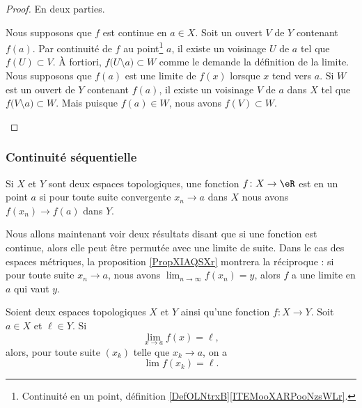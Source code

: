 \begin{proof}
	En deux parties.
	\begin{subproof}
		\spitem[\( \Rightarrow\)]
		Nous supposons que \( f\) est continue en \( a\in X\). Soit un ouvert \( V\) de \( Y\) contenant \( f(a)\). Par continuité de \( f\) au point\footnote{Continuité en un point, définition \ref{DefOLNtrxB}\ref{ITEMooXARPooNzsWLr}.} \( a\), il existe un voisinage \( U\) de \( a\) tel que \( f(U)\subset V\). À fortiori, \( f\big( U\setminus{{a}} \big)\subset W\) comme le demande la définition de la limite.
		\spitem[\( \Leftarrow\)]
		Nous supposons que \( f(a)\) est une limite de \( f(x)\) lorsque \( x\) tend vers \( a\). Si \( W\) est un ouvert de \( Y\) contenant \( f(a)\), il existe un voisinage \( V\) de \( a\) dans \( X\) tel que \( f\big( V\setminus{{a}} \big)\subset W\). Mais puisque \( f(a)\in W\), nous avons \( f(V)\subset W\).
	\end{subproof}
\end{proof}


\subsubsection{Continuité séquentielle}

\begin{definition}  \label{DefENioICV}
	Si \( X\) et \( Y \) sont deux espaces topologiques, une fonction \( f\colon X\to \eR\) est  en un point \( a\) si pour toute suite convergente \( x_n\to a\) dans \( X\) nous avons \( f(x_n)\to f(a)\) dans \( Y\).
\end{definition}

\begin{normaltext}
	Nous allons maintenant voir deux résultats disant que si une fonction est continue, alors elle peut être permutée avec une limite de suite. Dans le cas des espaces métriques, la proposition \ref{PropXIAQSXr} montrera la réciproque : si pour toute suite \(x_n\to a\), nous avons \( \lim_{n\to \infty} f(x_n)=y\), alors \( f\) a une limite en \( a\) qui vaut \( y\).
\end{normaltext}

\begin{proposition} \label{fContEstSeqCont}
	Soient deux espaces topologiques \( X\) et \( Y\) ainsi qu'une fonction \( f\colon X\to Y\). Soit \( a\in X\) et \( \ell\in Y\). Si
	\begin{equation}
		\lim_{x\to a} f(x)=\ell,
	\end{equation}
	alors, pour toute suite \( (x_k) \) telle que \( x_k \to a \), on a
	\begin{equation}
		\lim f(x_k)=\ell.
	\end{equation}
\end{proposition}

